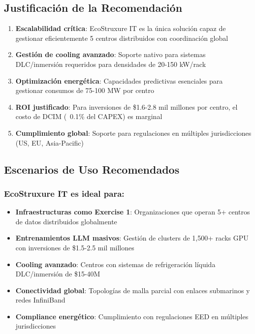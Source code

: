 \documentclass[12pt,a4paper]{article}
\begin{document}
\subsection{Justificación de la Recomendación}

\begin{enumerate}
    \item \textbf{Escalabilidad crítica}: EcoStruxure IT es la única solución capaz de gestionar eficientemente 5 centros distribuidos con coordinación global
    \item \textbf{Gestión de cooling avanzado}: Soporte nativo para sistemas DLC/inmersión requeridos para densidades de 20-150 kW/rack
    \item \textbf{Optimización energética}: Capacidades predictivas esenciales para gestionar consumos de 75-100 MW por centro
    \item \textbf{ROI justificado}: Para inversiones de \$1.6-2.8 mil millones por centro, el costo de DCIM (~0.1\% del CAPEX) es marginal
    \item \textbf{Cumplimiento global}: Soporte para regulaciones en múltiples jurisdicciones (US, EU, Asia-Pacific)
\end{enumerate}

\subsection{Escenarios de Uso Recomendados}

\subsubsection{EcoStruxure IT es ideal para:}
\begin{itemize}
    \item \textbf{Infraestructuras como Exercise 1}: Organizaciones que operan 5+ centros de datos distribuidos globalmente
    \item \textbf{Entrenamientos LLM masivos}: Gestión de clusters de 1,500+ racks GPU con inversiones de \$1.5-2.5 mil millones
    \item \textbf{Cooling avanzado}: Centros con sistemas de refrigeración líquida DLC/inmersión de \$15-40M
    \item \textbf{Conectividad global}: Topologías de malla parcial con enlaces submarinos y redes InfiniBand
    \item \textbf{Compliance energético}: Cumplimiento con regulaciones EED en múltiples jurisdicciones
\end{itemize}
\end{document}
